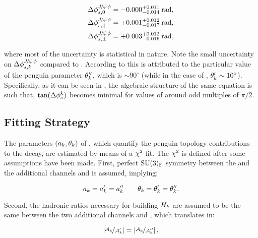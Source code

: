 \begin{subequations}
  \label{delta_phis_jpsirho}
  \begin{align}
    \Delta\phi^{{J\mskip -3mu/\mskip -2mu\psi\mskip 2mu}\phi}_{s,{0}}         & = -0.000^{+0.011}_{-0.014}\:\text{rad},\\
    \Delta\phi^{{J\mskip -3mu/\mskip -2mu\psi\mskip 2mu}\phi}_{s,{\parallel}} & = +0.001^{+0.012}_{-0.017}\:\text{rad},\\
    \Delta\phi^{{J\mskip -3mu/\mskip -2mu\psi\mskip 2mu}\phi}_{s,{\perp}}     & = +0.003^{+0.012}_{-0.016}\:\text{rad},
  \end{align}
\end{subequations}

\noindent where most of the uncertainty is statistical in nature. Note the small uncertainty on
$\Delta\phi^{{J\mskip -3mu/\mskip -2mu\psi\mskip 2mu}\phi}_{s,{k}}$ compared to . According to \cite{DeBruyn:2014oga,DeBruyn-thesis}
this is attributed to the particular value of the penguin parameter $\theta_k''$, which is
$\sim 90^\circ$ (while in the case of \BsJpsiKst, $\theta_k' \sim 10^\circ$).
Specifically, as it can be seen in , the algebraic structure of the
same equation is such that, $\tan(\Delta\phi_{s}^k)$ becomes minimal for values of \thkPeng{}
around odd multiples of $\pi/2$.

\subsection{Fitting Strategy}
\label{penguin_chi2_fit}

The parameters $(a_k,\theta_k)$ of , which quantify the penguin topology contributions
to the \BsJpsiPhi decay, are estimated by means of a $\chi^2$ fit. The $\chi^2$ is defined after some assumptions have
been made. First, perfect $\mathrm{SU}(3)_{\rm F}$ symmetry between the \BsJpsiPhi and the additional channels \BsJpsiKst
and \BdJpsiRho is assumed, implying:

\begin{equation}
a_k= a_k' = a_k'' \qquad \theta_k = \theta_k' = \theta_k''.
\label{su3_apply}
\end{equation}

\noindent Second, the hadronic ratios necessary for building $H_{k}$ are assumed to be the same between
the two additional channels \BsJpsiKst and \BdJpsiRho, which translates in:

\begin{equation}
  \centering
  \hadRatio{k}{}{\prime} =
  \hadRatio{k}{}{\prime\prime}.
    \label{had_ratios_assuption}
\end{equation}

